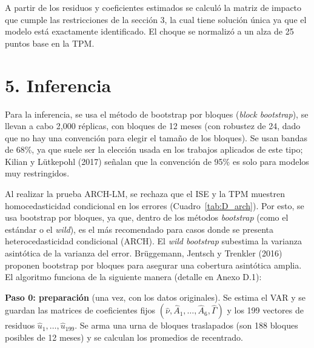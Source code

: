 \documentclass[12pt,letterpaper]{article}
\begin{document}
A partir de los residuos y coeficientes estimados se calculó la matriz de impacto que cumple las restricciones de la sección 3, la cual tiene solución única ya que el modelo está exactamente identificado. El choque se normalizó a un alza de 25 puntos base en la TPM.

\section*{5. Inferencia}

Para la inferencia, se usa el método de bootstrap por bloques (\textit{block bootstrap}), se llevan a cabo 2,000 réplicas, con bloques de 12 meses (con robustez de 24, dado que no hay una convención para elegir el tamaño de los bloques). Se usan bandas de 68\%, ya que suele ser la elección usada en los trabajos aplicados de este tipo; Kilian y Lütkepohl (2017) señalan que la convención de 95\% es solo para modelos muy restringidos.

Al realizar la prueba ARCH-LM, se rechaza que el ISE y la TPM muestren homocedasticidad condicional en los errores (Cuadro~\ref{tab:D_arch}). Por esto, se usa bootstrap por bloques, ya que, dentro de los métodos \textit{bootstrap} (como el estándar o el \textit{wild}), es el más recomendado para casos donde se presenta heterocedasticidad condicional (ARCH). El \textit{wild bootstrap} subestima la varianza asintótica de la varianza del error. Brüggemann, Jentsch y Trenkler (2016) proponen bootstrap por bloques para asegurar una cobertura asintótica amplia. El algoritmo funciona de la siguiente manera (detalle en Anexo D.1):

\textbf{Paso 0: preparación} (una vez, con los datos originales). Se estima el VAR y se guardan las matrices de coeficientes fijos $(\hat\nu, \hat A_1, \dots, \hat A_6, \hat\Gamma)$ y los 199 vectores de residuos $\hat u_1, \dots, \hat u_{199}$. Se arma una urna de bloques traslapados (son 188 bloques posibles de 12 meses) y se calculan los promedios de recentrado.
\end{document}
